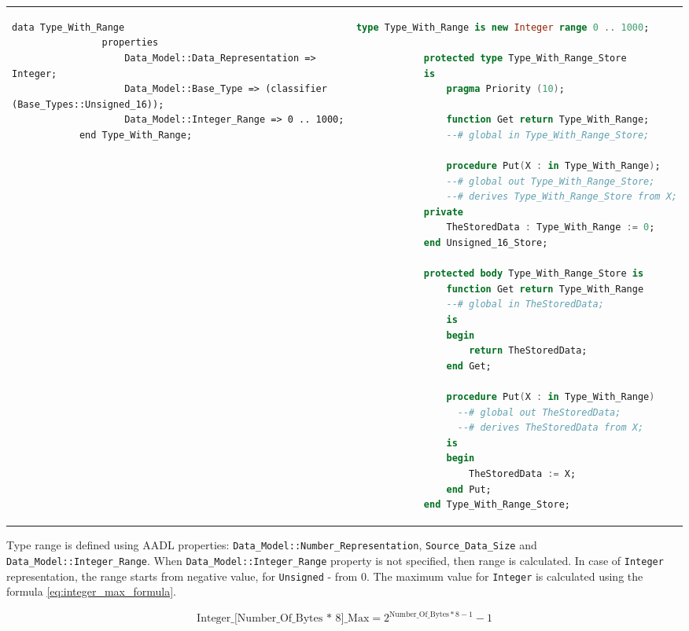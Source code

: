 \begin{center}
\begin{longtable}{| p{2in} | p{4in} |}
		\\ \hline

		\begin{lstlisting}[language=aadl]
			data Type_With_Range
				properties
					Data_Model::Data_Representation => Integer;
					Data_Model::Base_Type => (classifier (Base_Types::Unsigned_16));
					Data_Model::Integer_Range => 0 .. 1000;
			end Type_With_Range;
		\end{lstlisting} 
		&
		\begin{lstlisting}[language=ada]
			type Type_With_Range is new Integer range 0 .. 1000;
    
		    protected type Type_With_Range_Store
		    is
		        pragma Priority (10);

		        function Get return Type_With_Range;
		        --# global in Type_With_Range_Store;

		        procedure Put(X : in Type_With_Range);
		        --# global out Type_With_Range_Store;
		        --# derives Type_With_Range_Store from X;
		    private
		        TheStoredData : Type_With_Range := 0;
		    end Unsigned_16_Store;

		    protected body Type_With_Range_Store is
		        function Get return Type_With_Range
		        --# global in TheStoredData;
		        is
		        begin
		            return TheStoredData;
		        end Get;

		        procedure Put(X : in Type_With_Range)
		          --# global out TheStoredData;
		          --# derives TheStoredData from X;
		        is
		        begin
		            TheStoredData := X;
		        end Put;
		    end Type_With_Range_Store;

		\end{lstlisting}
	\end{longtable}
\end{center}
\doublespacing

Type range is defined using AADL properties: \lstinline{Data_Model::Number_Representation}, \lstinline{Source_Data_Size} and \lstinline{Data_Model::Integer_Range}. When \lstinline{Data_Model::Integer_Range} property is not specified, then range is calculated. In case of \lstinline{Integer} representation, the range starts from negative value, for \lstinline{Unsigned} - from 0. The maximum value for \lstinline{Integer} is calculated using the formula \ref{eq:integer_max_formula}. 

\begin{equation} \label{eq:integer_max_formula}
	\text{Integer\_[Number\_Of\_Bytes * 8]\_Max} = 2^{\text{Number\_Of\_Bytes} * 8 - 1} - 1
\end{equation}

